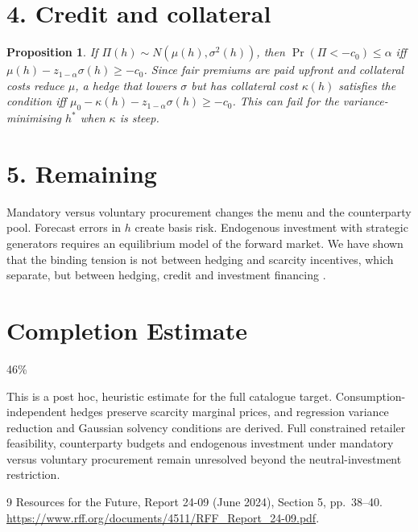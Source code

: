 \documentclass[11pt]{article}
\newtheorem{proposition}[theorem]{Proposition}
\theoremstyle{definition}
\begin{document}
\section*{4. Credit and collateral}
\begin{proposition}\label{prop:credit}
If $\Pi(h)\sim N(\mu(h),\sigma^2(h))$, then $\Pr(\Pi<-c_0)\le\alpha$ iff $\mu(h)-z_{1-\alpha}\sigma(h)\ge-c_0$. Since fair
premiums are paid upfront and collateral costs reduce $\mu$, a hedge that lowers $\sigma$ but has collateral cost $\kappa(h)$
satisfies the condition iff $\mu_0-\kappa(h)-z_{1-\alpha}\sigma(h)\ge-c_0$. This can fail for the variance-minimising $h^*$
when $\kappa$ is steep.
\end{proposition}

\section*{5. Remaining}
Mandatory versus voluntary procurement changes the menu and the counterparty pool. Forecast errors in $h$ create basis risk.
Endogenous investment with strategic generators requires an equilibrium model of the forward market. We have shown that the
binding tension is not between hedging and scarcity incentives, which separate, but between hedging, credit and investment
financing \cite{rff}.

\section{Completion Estimate}
46\%

This is a post hoc, heuristic estimate for the full catalogue target.
Consumption-independent hedges preserve scarcity marginal prices, and regression variance reduction and Gaussian solvency conditions are derived. Full constrained retailer feasibility, counterparty budgets and endogenous investment under mandatory versus voluntary procurement remain unresolved beyond the neutral-investment restriction.

\begin{thebibliography}{9}
 Resources for the Future, Report 24-09 (June 2024), Section 5, pp.~38--40. \url{https://www.rff.org/documents/4511/RFF_Report_24-09.pdf}.
\end{thebibliography}
\end{document}
